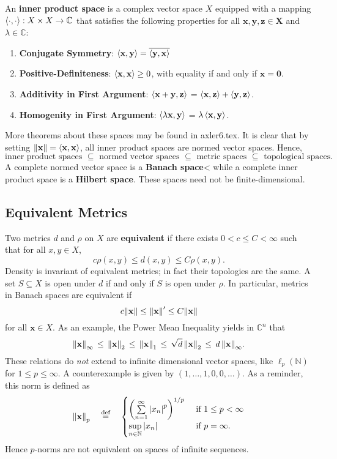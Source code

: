 \documentclass[11pt]{article}
\renewcommand{\vec}[1]{\mathbf{#1}}
\newcommand{\conjugate}[1]{\overline{#1}}
\begin{document}
An \textbf{inner product space} is a complex vector space $X$ equipped with a mapping $\ev{\cdot, \cdot} : X \times X \to \mathbb{C}$ that satisfies the following properties for all $\vec{x}, \vec{y}, \vec{z} \in \vec{X}$ and $\lambda \in \mathbb{C}$:
\begin{enumerate}
	\item \textbf{Conjugate Symmetry}: $\ev{\vec{x}, \vec{y}} = \conjugate{\ev{\vec{y}, \vec{x}}}$
	\item \textbf{Positive-Definiteness}: $\ev{\vec{x}, \vec{x}} \ge 0$, with equality if and only if $\vec{x} = \vec{0}$.
	\item \textbf{Additivity in First Argument}: $\ev{\vec{x} + \vec{y}, \vec{z}}$ = $\ev{\vec{x}, \vec{z}} + \ev{\vec{y}, \vec{z}}$.
	\item \textbf{Homogenity in First Argument}: $\ev{\lambda \vec{x}, \vec{y}}$ = $\lambda \ev{\vec{x}, \vec{y}}$.
\end{enumerate}
More theorems about these spaces may be found in axler6.tex. It is clear that by setting $\norm{\vec{x}} = \ev{\vec{x}, \vec{x}}$, all inner product spaces are normed vector spaces. Hence,
\[
  \text{inner product spaces } \subseteq \text{ normed vector spaces } \subseteq \text{ metric spaces } \subseteq \text{ topological spaces}.
\]
A complete normed vector space is a \textbf{Banach space}< while a complete inner product space is a \textbf{Hilbert space}. These spaces need not be finite-dimensional.


\subsection{Equivalent Metrics}

Two metrics $d$ and $\rho$ on $X$ are \textbf{equivalent} if there exists $0 < c \le C < \infty$ such that for all $x, y \in X$,
\[
	c \rho(x, y) \le d(x, y) \le C \rho(x, y).
\]
Density is invariant of equivalent metrics; in fact their topologies are the same. A set $S \subseteq X$ is open under $d$ if and only if $S$ is open under $\rho$. In particular, metrics in Banach spaces are equivalent if
\[
  c \norm{\vec{x}} \le \norm{\vec{x}}' \le C \norm{\vec{x}}
\]
for all $\vec{x} \in X$. As an example, the Power Mean Inequality yields in $\mathbb{C}^{n}$ that
\[
  \norm{\vec{x}}_{\infty} \, \le \, \norm{\vec{x}}_{2} \, \le \, \norm{\vec{x}}_{1} \, \le \, \sqrt{d} \, \norm{\vec{x}}_{2} \, \le \, d \, \norm{\vec{x}}_{\infty}.
\]
These relations do \textit{not} extend to infinite dimensional vector spaces, like $\ell_{p}(\mathbb{N})$ for $1 \le p \le \infty$. A counterexample is given by $(1, \ldots, 1, 0, 0, \ldots)$. As a reminder, this norm is defined as
\[
  \norm{\vec{x}}_{p} \quad \stackrel{\text{def}}{=} \quad  
  \begin{cases}
    \left( \sum\limits_{n = 1}^{\infty} \abs{x_{n}}^{p} \right)^{1/p} & \text{ if } 1 \le p < \infty \\
    \sup\limits_{n \in \mathbb{N}} \abs{x_{n}} & \text{ if } p = \infty.
  \end{cases}
\]
Hence $p$-norms are not equivalent on spaces of infinite sequences.
\end{document}
